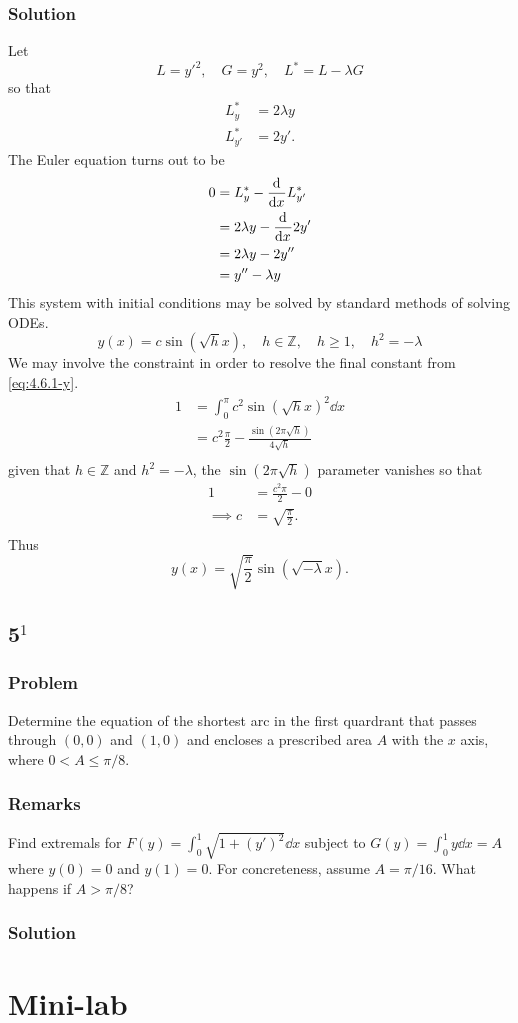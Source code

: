 \documentclass[12pt,twoside]{article}
\begin{document}
\subsubsection*{Solution}
Let
\begin{equation*}
  L = {y'}^2,\quad G = y^2, \quad L^* = L-\lambda G
\end{equation*}
so that
\begin{align*}
  L^*_y &= 2\lambda y \\
  L^*_{y'} &= 2y'.
\end{align*}
The Euler equation turns out to be
\begin{align*}
  0 &= L^*_y - \frac{\mathrm{d}^{} {}}{\mathrm{d}{x}^{}}L^*_{y'} \\
    &= 2\lambda y - \frac{\mathrm{d}^{} {}}{\mathrm{d}{x}^{}} 2y' \\
    &= 2\lambda y - 2y'' \\
    &= y'' - \lambda y
\end{align*}
This system with initial conditions may be solved by standard methods of solving
ODEs.
\begin{equation}
  \label{eq:4.6.1-y}
  y(x) = c \sin(\sqrt{h}x),\quad h \in \mathbb{Z},\quad h\ge1, \quad h^2=-\lambda
\end{equation}
We may involve the constraint in order to resolve the final constant from
\cref{eq:4.6.1-y}.
\begin{align*}
  1 &= \int_0^{\pi} c^2 {\sin(\sqrt{h}x)}^2 \dd{x} \\
    &= c^2\frac{\pi}{2}-\frac{\sin(2\pi\sqrt{h})}{4\sqrt{h}} \\
\end{align*}
given that $h\in\mathbb{Z}$ and $h^2=-\lambda$, the $\sin(2\pi\sqrt{h})$
parameter vanishes so that
\begin{align*}
  1 &= \frac{c^2\pi}{2} - 0 \\
  \implies c &= \sqrt{\frac{\pi}{2}}. \\
\end{align*}
Thus
\begin{equation*}
  \boxed{y(x) = \sqrt{\frac{\pi}{2}} \sin\left(\sqrt{-\lambda}x\right).}
\end{equation*}

\subsection{5$^1$}
\subsubsection*{Problem}
Determine the equation of the shortest arc in the first quardrant that passes
through $(0,0)$ and $(1,0)$ and encloses a prescribed area $A$ with the $x$
axis, where $0<A\le\pi/8$.
\subsubsection*{Remarks}
Find extremals for $F(y)=\int_0^1\sqrt{1+{(y')}^2}\dd{x}$ subject to
$G(y)=\int_0^1y\dd{x}=A$ where $y(0)=0$ and $y(1)=0$. For concreteness, assume
$A=\pi/16$. What happens if $A>\pi/8$?
\subsubsection*{Solution}
\todo{}

\section{Mini-lab}
\todo{}
\end{document}
